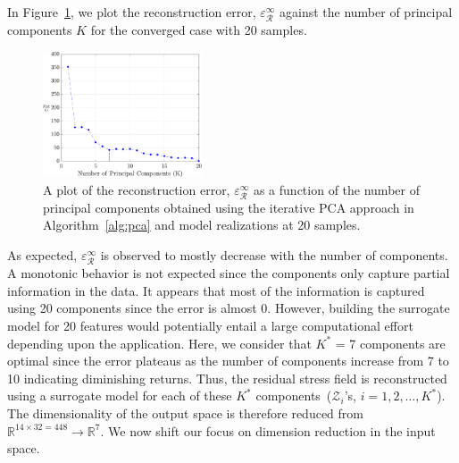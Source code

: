 In Figure~\ref{fig:pca}, we plot the reconstruction error, $\varepsilon_\mathcal{R}^\infty$ against the number of
principal components $K$ for the converged case with 20 samples. 
%
\begin{figure}[htbp]
\begin{center}
\includegraphics[width=0.42\textwidth]{./Figures/error_PCA}
\end{center}
\caption{A plot of the reconstruction error, $\varepsilon_\mathcal{R}^\infty$ as a function of the
number of principal components obtained using the iterative PCA approach in Algorithm~\ref{alg:pca}
and model realizations at 20 samples.}
\label{fig:pca}
\end{figure}
%
As expected, $\varepsilon_\mathcal{R}^\infty$ is observed to mostly decrease with the number of components. 
A monotonic behavior is not expected since the components only capture partial information in the data. It 
appears that most of the information is captured using 20 components since the error is almost 0. However,
building the surrogate model for 20 features would potentially entail a large computational effort depending upon the
application. Here, we consider that $K^\ast$ = 7 components are optimal since the error plateaus as the number of
components increase from 7 to 10 indicating diminishing returns. Thus, the residual stress field is reconstructed
using a surrogate model for each of these $K^\ast$ components~($\mathcal{Z}_i$'s, $i = 1,2,\ldots,K^\ast$).
The dimensionality of the output space is therefore reduced 
from $\mathbb{R}^{14\times 32=448}\rightarrow \mathbb{R}^7$. We now shift our focus on dimension reduction
in the input space.

